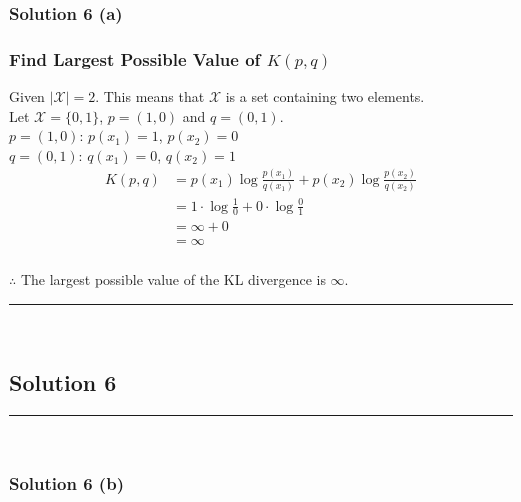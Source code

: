 \documentclass{article}
\begin{document}
\subsubsection*{Solution 6 (a)}

\subsubsection*{Find Largest Possible Value of $K(p, q)$}

\parbox{\textwidth}{
Given $|\mathcal{X}| = 2$. This means that $\mathcal{X}$ is a set containing two elements. \\

Let $\mathcal{X} = \{0,1\}$, $p=(1, 0)$ and $q=(0, 1)$. \\
$p=(1, 0)$: $p(x_1)=1$, $p(x_2)=0$ \\
$q=(0, 1)$: $q(x_1)=0$, $q(x_2)=1$ \\
\begin{align*}
    K(p, q) &= p(x_1) \log\frac{p(x_1)}{q(x_1)} + p(x_2) \log\frac{p(x_2)}{q(x_2)} \\
    &= 1 \cdot \log\frac{1}{0} + 0 \cdot \log\frac{0}{1} \\
    &= \infty + 0 \\
    &= \infty
\end{align*}
}
\subsubsection*{\normalfont}{$\therefore$ The largest possible value of the KL divergence is $\infty$.}


\noindent\rule{\textwidth}{0.4pt}\\

\newpage

\subsection*{Solution 6}
\noindent\rule{\textwidth}{0.4pt}\\
\subsubsection*{Solution 6 (b)}
\end{document}
